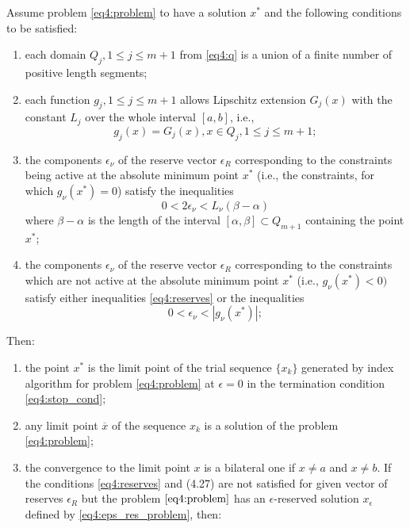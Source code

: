 \begin{theorem}
  Assume problem \eqref{eq4:problem} to have a solution $x^*$ and the following conditions to be satisfied:
  \begin{enumerate}
    \item each domain $Q_j ,1\le j\le m+1$ from \eqref{eq4:q} is a union of a finite number of positive length segments;
    \item each function $g_j ,1\le j\le m+1$ allows Lipschitz extension $G_j (x)$ with the constant $L_j$ over the whole interval $[a,b]$, i.e.,
    \begin{equation}
      g_j(x)=G_j(x),x\in Q_j,1\le j\le m+1;
    \end{equation}
    \item the components $\epsilon_\nu$ of the reserve vector $\epsilon_R$ corresponding to the constraints being active at the absolute minimum point $x^*$ (i.e., the constraints, for which $g_\nu(x^*)=0$) satisfy the inequalities
    \begin{equation}
      \label{eq4:reserves}
      0<2\epsilon_\nu<L_\nu(\beta-\alpha)
    \end{equation}
    where $\beta-\alpha$ is the length of the interval $[\alpha,\beta]\subset Q_{m + 1}$ containing the point $x^*$;
    \item the components $\epsilon_\nu$ of the reserve vector $\epsilon_R$ corresponding to the constraints which are not active at the absolute minimum point $x^*$ (i.e., $g_\nu(x^* )<0)$ satisfy either inequalities \eqref{eq4:reserves} or the inequalities
    \begin{equation}
      0< \epsilon_\nu <|g_\nu (x^* )|;
    \end{equation}
  \end{enumerate}

  Then:
  \begin{enumerate}
    \item the point $x^*$ is the limit point of the trial sequence $\{x_k \}$ generated by index algorithm for problem \eqref{eq4:problem} at $\epsilon =0$ in the termination condition \eqref{eq4:stop_cond};
    \item any limit point $\overline x$ of the sequence ${x_k }$ is a solution of the problem \eqref{eq4:problem};
    \item the convergence to the limit point $x$ is a bilateral one if $x\not=a$ and $x\not=b$.
    If the conditions \eqref{eq4:reserves} and (4.27) are not satisfied for given vector of reserves $\epsilon_R$ but the
    problem $\eqref{eq4:problem}$ has an $\epsilon$-reserved solution $x_\epsilon$ defined by \eqref{eq4:eps_res_problem}, then:


\end{enumerate}
\end{theorem}
